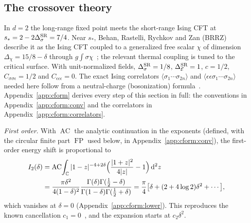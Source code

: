\documentclass[11pt,a4paper]{article}
\numberwithin{equation}{section}
\newcommand{\dd}{\,\mathrm d}
\newcommand{\De}{\Delta_{\mathcal E}}
\newcommand{\Ds}{\Delta_\sigma}
\newcommand{\AC}{\operatorname{AC}}
\newcommand{\FP}{\operatorname{FP}}
\begin{document}
\subsection{The crossover theory}
In $d=2$ the long-range fixed point meets the short-range Ising CFT at $s_*=2-2\Ds^{\rm SR}=7/4$. Near $s_*$,
Behan, Rastelli, Rychkov and Zan (BRRZ) describe it as the Ising CFT coupled to a generalized free scalar $\chi$ of
dimension $\Delta_\chi=15/8-\delta$ through $g\int\sigma\chi$~\cite{Behan:2017dwr,Behan:2017emf}; the relevant
thermal coupling is tuned to the critical surface. With unit-normalized fields, $\Delta_\sigma^{\rm SR}=1/8$,
$\De^{\rm SR}=1$, $c=1/2$, $C_{\sigma\sigma\epsilon}=1/2$ and $C_{\epsilon\epsilon\epsilon}=0$. The exact Ising
correlators $\langle\sigma_1\cdots\sigma_{2n}\rangle$ and $\langle\epsilon\epsilon\sigma_1\cdots\sigma_{2n}\rangle$
needed here follow from a neutral-charge (bosonization) formula~\cite{Ardonne:2010zz}. Appendix~\ref{app:cform} derives
every step of this section in full: the conventions in Appendix~\ref{app:cform:conv} and the correlators in
Appendix~\ref{app:cform:correlators}.

\emph{First order.} With $\AC$ the analytic continuation in the exponents (defined, with the circular finite part
$\FP$ used below, in Appendix~\ref{app:cform:conv}), the first-order energy shift is proportional to
\begin{equation}
\begin{aligned}
 I_2(\delta)&=\AC\!\int_{\mathbb C}|1-z|^{-4+2\delta}\Bigl(\frac{|1+z|^2}{4|z|}-1\Bigr)\dd^2z\\
 &=\frac{\pi \delta^2}{4(1-\delta)^2}\frac{\Gamma(\delta)\Gamma(\frac12-\delta)}{\Gamma(1-\delta)\Gamma(\frac12+\delta)}
 =\frac\pi4\bigl[\delta+(2+4\log2)\delta^2+\cdots\bigr],
\end{aligned}
\end{equation}
which vanishes at $\delta=0$ (Appendix~\ref{app:cform:lower}). This reproduces the known cancellation $c_1=0$~\cite{Behan:2017emf}, and the expansion
starts at $c_2\delta^2$.
\end{document}
